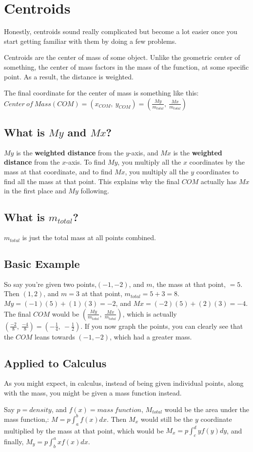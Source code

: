\documentclass[letterpaper, 12pt]{article}
\begin{document}
\section{Centroids}
Honestly, centroids sound really complicated but become a lot easier once you start getting familiar with them by doing a few problems. \par
Centroids are the center of mass of some object. Unlike the geometric center of something, the center of mass factors in the mass of the function, at some specific point. As a result, the distance is weighted. \par
The final coordinate for the center of mass is something like this: $
    Center\ of\ Mass\left(COM\right)=\left(x_{COM},\ y_{COM}\right)=\boxed{\left(\frac{My}{m_{total}},\ \frac{Mx}{m_{total}}\right)}$ \par
\subsection{What is $My$ and $Mx$?}
$My$ is the \textbf{weighted distance} from the $y$-axis, and $Mx$ is the \textbf{weighted distance} from the $x$-axis. To find $My$, you multiply all the $x$ coordinates by the mass at that coordinate, and to find $Mx$, you multiply all the $y$ coordinates to find all the mass at that point. This explains why the final $COM$ actually has $Mx$ in the first place and $My$ following.
\subsection{What is $m_{total}$?}
$m_{total}$ is just the total mass at all points combined.
\subsection{Basic Example}
So say you're given two points,$\left(-1,-2\right)$, and $m$, the mass at that point, $=5$. Then $\left(1,2\right)$, and $m=3$ at that point, $m_{total}=5+3=8$. $My=\left(-1\right)\left(5\right)+\left(1\right)\left(3\right)=-2$, and $Mx=\left(-2\right)\left(5\right)+\left(2\right)\left(3\right)=-4$. The final $COM$ would be $
    \left(\frac{My}{m_{total}},\ \frac{Mx}{m_{total}}\right)$, which is actually $\left(\frac{-2}{8},\ \frac{-4}{8}\right)=\left(-\frac{1}{4},\ -\frac{1}{2}\right)$. If you now graph the points, you can clearly see that the $COM$ leans towards $\left(-1,-2\right)$, which had a greater mass.
\subsection{Applied to Calculus}
As you might expect, in calculus, instead of being given individual points, along with the mass, you might be given a mass function instead. \par
Say $p=density$, and $f(x)=mass\:function$, $M_{total}$ would be the area under the mass function,: $M=p\int_{a}^{b}f\left(x\right)dx$. Then $M_{x}$ would still be the $y$ coordinate multiplied by the mass at that point, which would be $M_{x}=p\int_{c}^{d}yf\left(y\right)dy$, and finally, $M_{y}=p\int_{b}^{a}xf\left(x\right)dx$.
\end{document}
